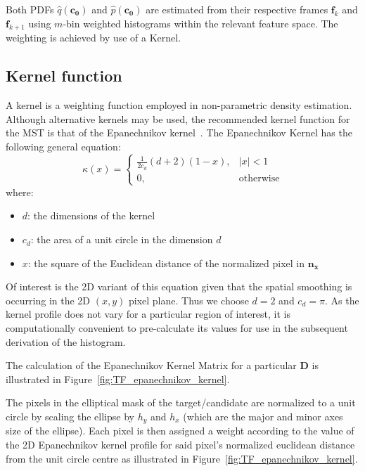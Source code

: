 Both PDFs $\hat{q}(\mathbf{c_0})$ and $\hat{p}(\mathbf{c_0})$ are estimated from
their respective frames $\mathbf{f}_k$ and $\mathbf{f}_{k+1}$ using $m$-bin
weighted histograms within the relevant feature space. The weighting is achieved
by use of a Kernel. 

\subsection{Kernel function}
A kernel is a weighting function employed in non-parametric density estimation.
Although alternative kernels may be used, the recommended kernel function for the MST is that of the
Epanechnikov kernel~\cite{Comaniciu2002}.
The Epanechnikov Kernel has the following general equation:
\begin{equation}
    \kappa(x)=
    \begin{cases}
        \frac{1}{2c_d}(d+2)(1-x), & |x|<1 \\
        0, & \text{otherwise}
    \end{cases}
\end{equation}
where:
\begin{itemize}
   \item $d$: the dimensions of the kernel
   \item $c_d$: the area of a unit circle in the dimension $d$
   \item $x$: the square of the Euclidean distance of the normalized pixel in
       $\mathbf{n_x}$
\end{itemize}

Of interest is the 2D variant of this equation given that the spatial smoothing
is occurring in the 2D $(x,y)$ pixel plane. Thus we choose $d=2$ and $c_d=\pi$.
As the kernel profile does not vary for a particular region of interest, it is
computationally convenient to pre-calculate its values for use in the subsequent
derivation of the histogram.

The calculation of the Epanechnikov Kernel Matrix for a particular $\mathbf{D}$ is
illustrated in Figure~\ref{fig:TF_epanechnikov_kernel}.


The pixels in the elliptical mask of the target/candidate are normalized to a unit
circle by scaling the ellipse by $h_y$ and $h_x$ (which are the major and minor
axes size of the ellipse). Each pixel is then assigned a weight according to the
value of the 2D Epanechnikov kernel profile for said pixel's normalized euclidean
distance from the unit circle centre as illustrated in Figure~\ref{fig:TF_epanechnikov_kernel}.

